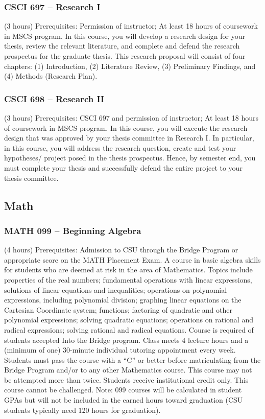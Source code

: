 \subsubsection{CSCI 697 -- Research I}
(3 hours) Prerequisites: Permission of instructor; At least 18 hours of coursework in MSCS program.   In this course, you will develop a research design for your thesis, review the relevant literature, and complete and defend the research prospectus for the graduate thesis. This research proposal will consist of four chapters: (1) Introduction, (2) Literature Review, (3) Preliminary Findings, and (4) Methods (Research Plan). 

\subsubsection{CSCI 698 -- Research II}
(3 hours) Prerequisites: CSCI 697 and permission of instructor; At least 18 hours of coursework in MSCS program. In this course, you will execute the research design that was approved by your thesis committee in Research I. In particular, in this course, you will address the research question, create and test your hypotheses/ project posed in the thesis prospectus. Hence, by semester end, you must complete your thesis and successfully defend the entire project to your thesis committee. 

\subsection{Math}

\subsubsection{MATH 099 -- Beginning Algebra}
(4 hours) Prerequisites: Admission to CSU through the Bridge Program or appropriate score on the MATH Placement Exam. A course in basic algebra skills for students who are deemed at risk in the area of Mathematics. Topics include properties of the real numbers; fundamental operations with linear expressions, solutions of linear equations and inequalities; operations on polynomial expressions, including polynomial division; graphing linear equations on the Cartesian Coordinate system; functions; factoring of quadratic and other polynomial expressions; solving quadratic equations; operations on rational and radical expressions; solving rational and radical equations. Course is required of students accepted Into the Bridge program. Class meets 4 lecture hours and a (minimum of one) 30-minute individual tutoring appointment every week. Students must pass the course with a “C” or better before matriculating from the Bridge Program and/or to any other Mathematics course. This course may not be attempted more than twice. Students receive institutional credit only. This course cannot be challenged. Note: 099 courses will be calculated in student GPAs but will not be included in the earned hours toward graduation (CSU students typically need 120 hours for graduation).

